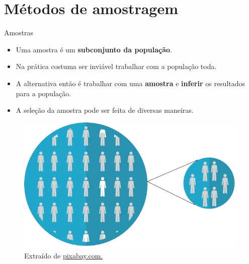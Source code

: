 \documentclass[
  ignorenonframetext,
  serif,
  professionalfont,
  usenames,
  dvipsnames,
  aspectratio = 169]{beamer}
\providecommand{\tightlist}{%
  \setlength{\itemsep}{0pt}\setlength{\parskip}{0pt}}
\renewcommand{\tightlist}{%
  \setlength{\itemsep}{0\baselineskip}
  \setlength{\parskip}{0.25\baselineskip}
}
\def\beginAHalfColumn{\begin{minipage}{0.49\textwidth}}%
\def\endColumns{\end{minipage}}%
\begin{document}
\section{Métodos de amostragem}\label{muxe9todos-de-amostragem}

\begin{frame}{Amostras}
\label{amostras}
\beginAHalfColumn

\begin{itemize}
\tightlist
\item
  Uma amostra é um \textbf{subconjunto da população}.
\end{itemize}

\vspace{0.3cm}

\begin{itemize}
\tightlist
\item
  Na prática costuma ser inviável trabalhar com a população toda.
\end{itemize}

\vspace{0.3cm}

\begin{itemize}
\tightlist
\item
  A alternativa então é trabalhar com uma \textbf{amostra} e
  \textbf{inferir} os resultados para a população.
\end{itemize}

\vspace{0.3cm}

\begin{itemize}
\tightlist
\item
  A seleção da amostra pode ser feita de diversas maneiras.
\end{itemize}

\endColumns
\beginAHalfColumn

\begin{figure}

{\centering \includegraphics[width=1\linewidth]{./img/populacao-amostra3} 

}

\caption{Extraído de \href{https://cdn.pixabay.com/photo/2017/10/25/18/18/rare-disease-2888820_1280.png}{pixabay.com.}}\label{fig:unnamed-chunk-28}
\end{figure}

\endColumns
\end{frame}
\end{document}
